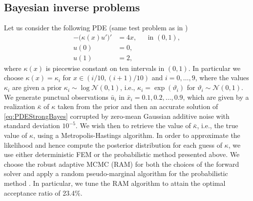\documentclass{siamart1116}
\numberwithin{theorem}{section}
\renewcommand{\theta}{\vartheta}
\begin{document}
\subsection{Bayesian inverse problems} Let us consider the following PDE (same test problem as in \cite{CGS16})
\begin{equation}\label{eq:PDEStrongBayes}
\begin{aligned}
-\big(\kappa(x)u'\big)' &= 4x, && \text{in } (0, 1),\\
	u(0) &= 0,\\
	u(1) &= 2,
\end{aligned}
\end{equation}	
where $\kappa(x)$ is piecewise constant on ten intervals in $(0, 1)$. In particular we choose $\kappa(x) = \kappa_i$ for $x \in (i/10, (i+1)/10)$ and $i = 0, \ldots, 9$, where the values $\kappa_i$ are given a prior $\kappa_i \sim \log \mathcal{N}(0, 1)$, i.e., $\kappa_i = \exp(\theta_i)$ for $\theta_i \sim \mathcal{N}(0, 1)$. We generate punctual observations $\bar u_i$ in $\bar x_i = 0.1, 0.2, \ldots, 0.9$, which are given by a realization $\bar \kappa$ of $\kappa$ taken from the prior and then an accurate solution of \eqref{eq:PDEStrongBayes} corrupted by zero-mean Gaussian additive noise with standard deviation $10^{-5}$. We wish then to retrieve the value of $\bar \kappa$, i.e., the true value of $\kappa$, using a Metropolis-Hastings algorithm. In order to approximate the likelihood and hence compute the posterior distribution for each guess of $\kappa$, we use either deterministic FEM or the probabilistic method presented above. We choose the robust adaptive MCMC (RAM) \cite{Vih12} for both the choices of the forward solver and apply a random pseudo-marginal algorithm for the probabilistic method \cite{MLR16}. In particular, we tune the RAM algorithm to attain the optimal acceptance ratio of 23.4\%.



\end{document}
